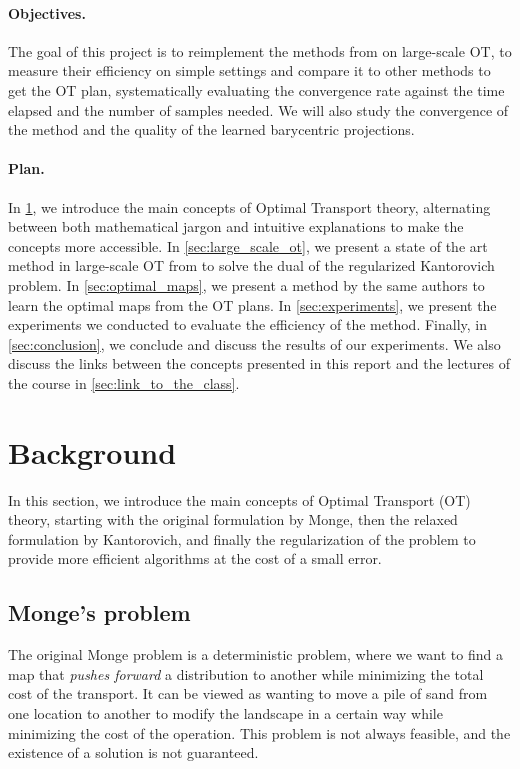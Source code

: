 \documentclass[a4paper,11pt]{article}
\newcommand{\1}{\mathbbm{1}}
\begin{document}
\paragraph{Objectives.}The goal of this project is to reimplement the methods from \citet{seguy2018largescaleoptimaltransportmapping} on large-scale OT, to measure their efficiency on simple settings and compare it to other methods to get the OT plan, systematically evaluating the convergence rate against the time elapsed and the number of samples needed. We will also study the convergence of the method and the quality of the learned barycentric projections.

\paragraph{Plan.}In \cref{sec:background}, we introduce the main concepts of Optimal Transport theory, alternating between both mathematical jargon and intuitive explanations to make the concepts more accessible. In \cref{sec:large_scale_ot}, we present a state of the art method in large-scale OT from \citet{seguy2018largescaleoptimaltransportmapping} to solve the dual of the regularized Kantorovich problem. In \cref{sec:optimal_maps}, we present a method by the same authors to learn the optimal maps from the OT plans. In \cref{sec:experiments}, we present the experiments we conducted to evaluate the efficiency of the method. Finally, in \cref{sec:conclusion}, we conclude and discuss the results of our experiments. We also discuss the links between the concepts presented in this report and the lectures of the course in \cref{sec:link_to_the_class}.

\section{Background}
\label{sec:background}

In this section, we introduce the main concepts of Optimal Transport (OT) theory, starting with the original formulation by Monge, then the relaxed formulation by Kantorovich, and finally the regularization of the problem to provide more efficient algorithms at the cost of a small error.

\subsection{Monge's problem}
\label{sec:monge}

The original Monge problem is a deterministic problem, where we want to find a map that \emph{pushes forward} a distribution to another while minimizing the total cost of the transport. It can be viewed as wanting to move a pile of sand from one location to another to modify the landscape in a certain way while minimizing the cost of the operation. This problem is not always feasible, and the existence of a solution is not guaranteed.
\end{document}
